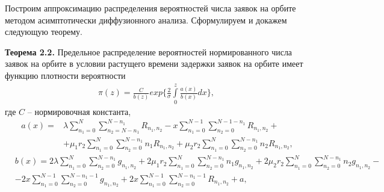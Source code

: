 Построим аппроксимацию распределения вероятностей числа заявок на орбите методом асимптотически диффузионного анализа. Сформулируем и докажем следующую теорему.

\textbf{ Теорема 2.2.} Предельное распределение вероятностей нормированного числа заявок на орбите в условии растущего времени задержки заявок на орбите имеет функцию плотности вероятности
\begin{align}
	\pi (z)= \frac{C}{b(z)}exp\bigg\{\frac{2}{\sigma} \int\limits_0^z \frac{a(x)}{b(x)}dx\bigg\},
\end{align} 
где  $C$ -- нормировочная константа,
\begin{equation*}
	\begin{aligned}\
		a(x)=&\lambda \sum_{n_1=0}^N\sum_{n_2=N-n_1}^{N-n_1} 
		R_{n_{1}, n_{2}}
		- x\sum_{n_1=0}^{N-1}\sum_{n_2=0}^{N-1-n_1} 
		R_{n_{1}, n_{2}}+\\
		&+\mu_1 r_2 \sum_{n_1=0}^{N}\sum_{n_2=0}^{N-n_1} 
		n_1 R_{n_{1}, n_{2}}
		+\mu_2 r_2 \sum_{n_1=0}^{N}\sum_{n_2=0}^{N-n_1} 
		n_2 R_{n_{1}, n_{2}},
	\end{aligned}
\end{equation*}
\begin{equation*}
	\begin{aligned}
		&b(x)=2\lambda\sum_{n_1=0}^N\sum_{n_2=0}^{N-n_1}g_{n_{1}, n_{2}}+2\mu_{1}r_{2}\sum_{n_1=0}^{N}\sum_{n_2=0}^{N-n_1}n_{1}g_{n_{1}, n_{2}}+2\mu_{2}r_{2}\sum_{n_1=0}^{N}\sum_{n_2=0}^{N-n_1}n_{2}g_{n_{1}, n_{2}}-\\
		&-2x\sum_{n_1=0}^{N-1}\sum_{n_2=0}^{N-n_1-1}g_{n_{1}, n_{2}}+2x\sum_{n_1=0}^{N-1}\sum_{n_2=0}^{N-n_1-1}R_{n_{1}, n_{2}}+a,
	\end{aligned}
\end{equation*}

